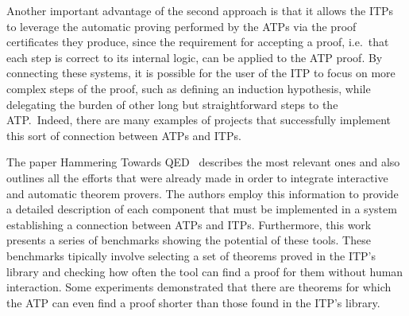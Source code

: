 Another important advantage of the second approach is that it allows the ITPs to leverage the automatic proving performed by the ATPs via the proof certificates they produce, since the requirement for accepting a proof, i.e.\ that each step is correct to its internal logic, can be applied to the ATP proof.
%
By connecting these systems, it is possible for the user of the ITP to focus on more complex steps of the proof, such as defining an induction hypothesis, while delegating the burden of other long but straightforward steps to the ATP.\
Indeed, there are many examples of projects that successfully
implement this sort of connection between ATPs and ITPs.

The paper Hammering Towards QED~\cite{hammering} describes
the most relevant ones and also outlines
all the efforts that were already made in order to integrate
interactive and automatic theorem provers. The authors employ
this information to provide a detailed description of each
component that must be implemented in a system establishing
a connection between ATPs and ITPs. Furthermore, this work
presents a series of benchmarks showing the potential of these
tools. These benchmarks tipically involve selecting a set
of theorems proved in the ITP's library and checking how often the
tool can find a proof for them without human interaction.
Some experiments demonstrated that there are theorems for which
the ATP can even find a proof shorter than those found in the ITP's library.
